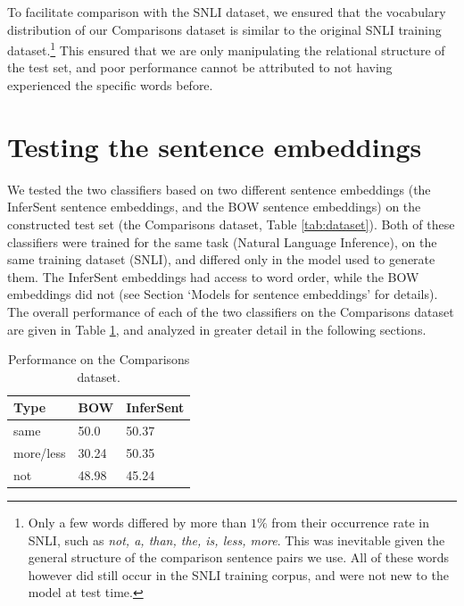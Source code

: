 To facilitate comparison with the SNLI dataset, we ensured that the vocabulary distribution of our Comparisons dataset is similar to the original SNLI training dataset.\footnote{Only a few words differed by more than $1 \%$ from their occurrence rate in SNLI, such as \textit{not, a, than, the, is, less, more}. This was inevitable given the general structure of the comparison sentence pairs we use. All of these words however did still occur in the SNLI training corpus, and were not new to the model at test time.} This ensured that we are only manipulating the relational structure of the test set, and poor performance cannot be attributed to not having experienced the specific words before.

\section{Testing the sentence embeddings}

We tested the two classifiers based on two different sentence embeddings (the InferSent sentence embeddings, and the BOW sentence embeddings) on the constructed test set (the Comparisons dataset, Table \ref{tab:dataset}). Both of these classifiers were trained for the same task (Natural Language Inference), on the same training dataset (SNLI), and differed only in the model used to generate them. The InferSent embeddings had access to word order, while the BOW embeddings did not (see Section `Models for sentence embeddings' for details). The overall performance of each of the two classifiers on the Comparisons dataset are given in Table \ref{tab:pretrainperf}, and analyzed in greater detail in the following sections.

\begin{table}[htb]
\begin{center}
  \begin{tabular}{p{20mm} p{20mm} p{20mm}} 
 \toprule
 Type & BOW & InferSent \\
    \midrule
same & 50.0 &50.37\\
 more/less & 30.24 &50.35\\
not & 48.98 & 45.24\\
\bottomrule
\end{tabular}
 \caption{Performance on the Comparisons dataset.}
  \label{tab:pretrainperf}
  \end{center}
\end{table}

